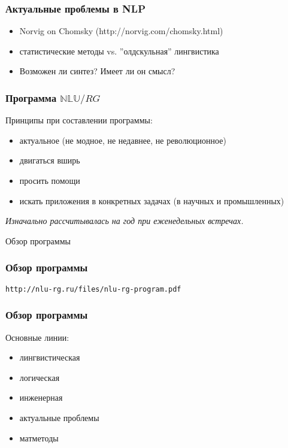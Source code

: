 \documentclass{beamer}
\begin{document}
\begin{frame}[fragile]
\frametitle{Актуальные проблемы в NLP}
\begin{itemize}
  \item Norvig on Chomsky (http://norvig.com/chomsky.html) 
  \item статистические методы vs. ''олдскульная'' лингвистика 
  \item Возможен ли синтез? Имеет ли он смысл?
\end{itemize}
\end{frame}

\begin{frame}[fragile]
\frametitle{Программа $\mathbb{NLU}/RG$}
Принципы при составлении программы:\bigskip 
\begin{itemize}
  \item актуальное (не модное, не недавнее, не революционное)
  \item двигаться вширь
  \item просить помощи
  \item искать приложения в конкретных задачах (в научных и промышленных)
\end{itemize}
\bigskip  
\textit{Изначально рассчитывалась на год при еженедельных встречах.}
\end{frame}

\begin{frame}{}
\thispagestyle{empty}
\begin{center}
{\large Обзор программы}
\end{center}
\end{frame}

\begin{frame}[fragile]
\frametitle{Обзор программы}
\begin{center}
\texttt{http://nlu-rg.ru/files/nlu-rg-program.pdf}
\end{center}
\end{frame}

\begin{frame}[fragile]
\frametitle{Обзор программы}
Основные линии:\bigskip
\begin{itemize}
  \item лингвистическая
  \item логическая
  \item инженерная
  \item актуальные проблемы
  \item матметоды
\end{itemize}
\end{frame}
\end{document}
